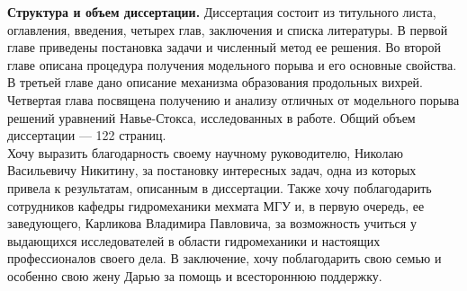 {\bf Структура и объем диссертации.} 
Диссертация состоит из титульного листа, оглавления, введения, четырех глав, заключения и списка литературы. В первой главе приведены постановка задачи и численный метод ее решения. Во второй главе описана процедура получения модельного порыва и его основные свойства. В третьей главе дано описание механизма образования продольных вихрей. Четвертая глава посвящена получению и анализу отличных от модельного порыва решений уравнений Навье-Стокса, исследованных в работе. Общий объем диссертации --- 122 страниц.
\\[0pt]


Хочу выразить благодарность своему научному руководителю, Николаю Васильевичу Никитину, за постановку интересных задач, одна из которых привела к результатам, описанным в диссертации. Также хочу поблагодарить сотрудников кафедры гидромеханики мехмата МГУ и, в первую очередь, ее заведующего, Карликова Владимира Павловича, за возможность учиться у выдающихся исследователей в области гидромеханики и настоящих профессионалов своего дела. В заключение, хочу поблагодарить свою семью и особенно свою жену Дарью за помощь и всестороннюю поддержку. 





